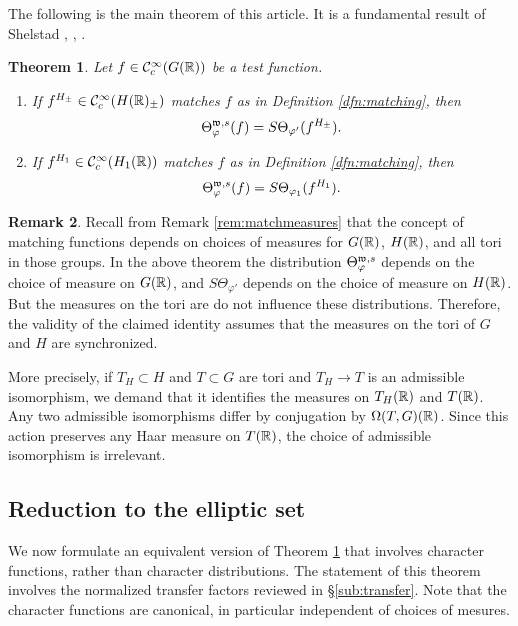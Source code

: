 \documentclass{article}
\newtheorem{thm}{Theorem}[subsection]
\theoremstyle{definition}
\newtheorem{rem}[thm]{Remark}
\numberwithin{equation}{section}
\renewcommand{\-}{\hyp{}}
\begin{document}
The following is the main theorem of this article. It is a fundamental result of Shelstad \cite{She82}, \cite{SheTE2}, \cite{SheTE3}.
\begin{thm} \label{thm:main1}
Let $f \in \mathcal{C}^\infty_c(G(\mathbb{R}))$ be a test function.
\begin{enumerate}
	\item If $f^{H_\pm} \in \mathcal{C}^\infty_c(H(\mathbb{R})_\pm)$ matches $f$ as in Definition \ref{dfn:matching}, then
	\[ \Theta_\varphi^{\mathfrak{w},s}(f) = S\Theta_{\varphi'}(f^{H_\pm}). \]
	\item If $f^{H_1} \in \mathcal{C}^\infty_c(H_1(\mathbb{R}))$ matches $f$ as in Definition \ref{dfn:matching}, then
	\[ \Theta_\varphi^{\mathfrak{w},s}(f) = S\Theta_{\varphi_1}(f^{H_1}). \]
\end{enumerate}
\end{thm}

\begin{rem} \label{rem:measures}
	Recall from Remark \ref{rem:matchmeasures} that the concept of matching functions depends on choices of measures for $G(\mathbb{R})$, $H(\mathbb{R})$, and all tori in those groups. In the above theorem the distribution $\Theta^{\mathfrak{w},s}_\varphi$ depends on the choice of measure on $G(\mathbb{R})$, and $S\Theta_{\varphi'}$ depends on the choice of measure on $H(\mathbb{R})$. But the measures on the tori are do not influence these distributions. Therefore, the validity of the claimed identity assumes that the measures on the tori of $G$ and $H$ are synchronized.

	More precisely, if $T_H \subset H$ and $T \subset G$ are tori and $T_H \to T$ is an admissible isomorphism, we demand that it identifies the measures  on $T_H(\mathbb{R})$ and $T(\mathbb{R})$. Any two admissible isomorphisms differ by conjugation by $\Omega(T,G)(\mathbb{R})$. Since this action preserves any Haar measure on $T(\mathbb{R})$, the choice of admissible isomorphism is irrelevant.
\end{rem}

\subsection{Reduction to the elliptic set}

We now formulate an equivalent version of Theorem \ref{thm:main1} that involves character functions, rather than character distributions. The statement of this theorem involves the normalized transfer factors reviewed in \S\ref{sub:transfer}. Note that the character functions are canonical, in particular independent of choices of mesures.
\end{document}
